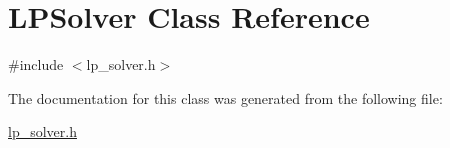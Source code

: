 \hypertarget{classLPSolver}{\section{L\-P\-Solver Class Reference}
\label{classLPSolver}
}


{\ttfamily \#include $<$lp\-\_\-solver.\-h$>$}



The documentation for this class was generated from the following file\-:\begin{DoxyCompactItemize}
\item 
\hyperlink{lp__solver_8h}{lp\-\_\-solver.\-h}\end{DoxyCompactItemize}
